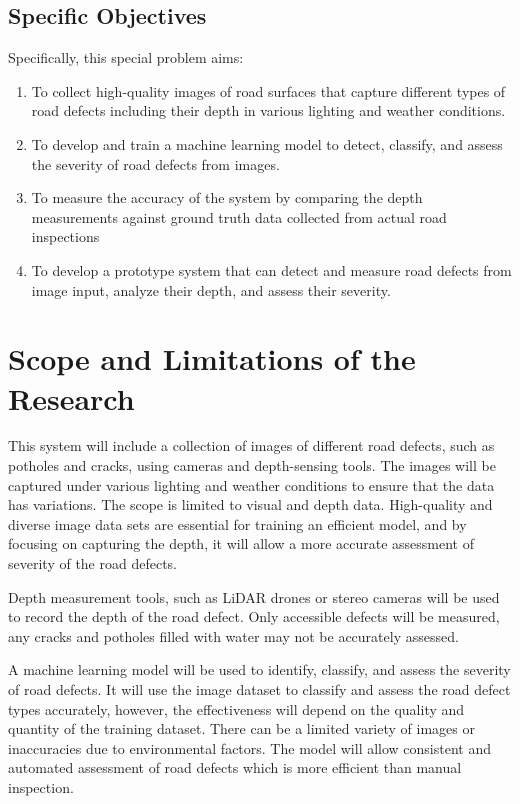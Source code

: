 \subsection{Specific Objectives}
\label{sec:specificobjectives}

Specifically, this special problem aims:
\begin{enumerate}
   \item To collect high-quality images of road surfaces that capture different types of road defects including their depth in various lighting and weather conditions.
   \item To develop and train a machine learning model to detect, classify, and assess the severity of road defects from images. 
   \item To measure the accuracy of the system by comparing the depth measurements against ground truth data collected from actual road inspections
   \item To develop a prototype system that can detect and measure road defects from image input, analyze their depth, and assess their severity.
\end{enumerate}


\section{Scope and Limitations of the Research}
\label{sec:scopelimitations}



This system will include a collection of images of  different road defects, such as potholes and cracks, using cameras and depth-sensing tools. The images will be captured under various lighting and weather conditions to ensure that the data has variations. The scope is limited to visual and depth data. High-quality and diverse  image data sets are essential for training an efficient model, and by focusing on capturing the depth, it will allow a more accurate assessment of severity of the road defects. 


Depth measurement tools, such as LiDAR drones or stereo cameras will be used to record the depth of the road defect. Only accessible defects will be measured, any cracks and potholes filled with water may not be accurately assessed. 


A machine learning model will be used to identify, classify, and assess the severity of road defects. It will use the image dataset to classify and assess the road defect types accurately, however, the effectiveness will depend on the quality and quantity of the training dataset. There can be a limited variety of images or inaccuracies due to environmental factors. The model will allow consistent and automated assessment of road defects which is more efficient than manual inspection. 


